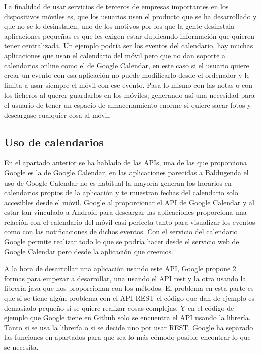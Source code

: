 La finalidad de usar servicios de terceros de empresas importantes en los dispositivos móviles es, que los usuarios usen el producto que se ha desarrollado y que no se lo desinstalen, uno de los motivos por los que la gente desinstala aplicaciones pequeñas es que les exigen estar duplicando información que quieren tener centralizada. Un ejemplo podría ser los eventos del calendario, hay muchas aplicaciones que usan el calendario del móvil pero que no dan soporte a calendarios online como el de Google Calendar, en este caso si el usuario quiere crear un evento con esa aplicación no puede modificarlo desde el ordenador y le limita a usar siempre el móvil con ese evento.
Pasa lo mismo con las notas o con los ficheros al querer guardarlos en los móviles, generando así una necesidad para el usuario de tener un espacio de almacenamiento enorme si quiere sacar fotos y descargase cualquier cosa al móvil.

\subsection{Uso de calendarios}
\label{subsecc:Uso de calendarios}

En el apartado anterior se ha hablado de las APIs,  una de las que proporciona Google es la de Google Calendar, en las aplicaciones parecidas a Baldugenda el uso de Google Calendar no es habitual la mayoría generan los horarios en calendarios propios de la aplicación y te muestran fechas del calendario solo accesibles desde el móvil.
Google al proporcionar el API de Google Calendar y al estar tan vinculado a Android para descargar las aplicaciones proporciona una relación con el calendario del móvil casi perfecta tanto para visualizar los eventos como con las notificaciones de dichos eventos.
Con el servicio del calendario Google permite realizar todo lo que se podría hacer desde el servicio web de Google Calendar pero desde la aplicación que creemos.

A la hora de desarrollar una aplicación usando este API, Google propone 2 formas para empezar a desarrollar, una usando el API \acrshort{rest} y la otra usando la librería java que nos proporcionan con los métodos.
El problema en esta parte es que si se tiene algún problema con el API REST el código que dan de ejemplo es demasiado pequeño si se quiere realizar cosas complejas. Y en el código de ejemplo que Google tiene en \gls{Github} solo se encuentra el API usando la librería.
Tanto si se usa la librería o si se decide uno por usar REST, Google ha separado las funciones en apartados para que sea lo más cómodo posible encontrar lo que se necesita.

